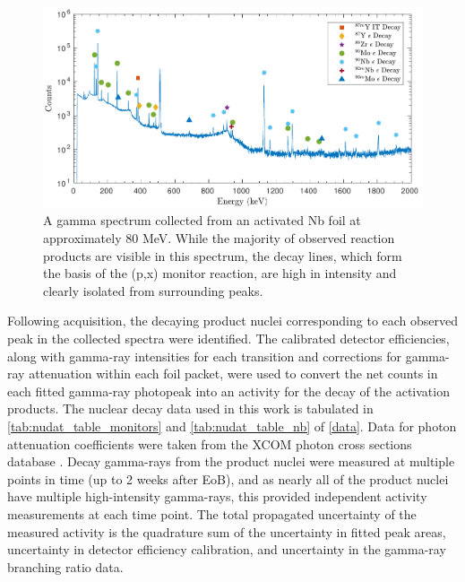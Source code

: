 \begin{figure}
 \centering
 \includegraphics[width=6in]{./figures/sample_gspec.pdf}
 \caption{A gamma spectrum collected from an activated Nb foil at approximately 80 MeV. While the majority of observed reaction products are visible in this spectrum,  the  decay lines, which form the basis of the (p,x) monitor reaction, are high in intensity and clearly isolated from surrounding peaks.}
 \label{fig:gspec}
\end{figure}


Following  acquisition, the decaying product nuclei corresponding to each observed peak in the collected spectra were identified.
The calibrated detector efficiencies, along with gamma-ray intensities for each transition and  corrections for gamma-ray attenuation within each foil packet, were used to convert the net  counts in each fitted gamma-ray photopeak into an activity for the decay of the activation products.  
The nuclear decay data used in this work is tabulated in \autoref{tab:nudat_table_monitors} and \autoref{tab:nudat_table_nb} of \ref{data}.
Data for photon attenuation coefficients were taken from the XCOM photon cross sections database  \cite{berger2011xcom}.
Decay gamma-rays from the product nuclei were measured at multiple points in time (up to 2 weeks after EoB), and as nearly all of the product nuclei have multiple high-intensity gamma-rays, this provided independent activity measurements at each time point.
The total propagated uncertainty of the measured activity is the quadrature sum of the uncertainty in  fitted peak areas, uncertainty in detector efficiency calibration, and uncertainty in the gamma-ray branching ratio data.






